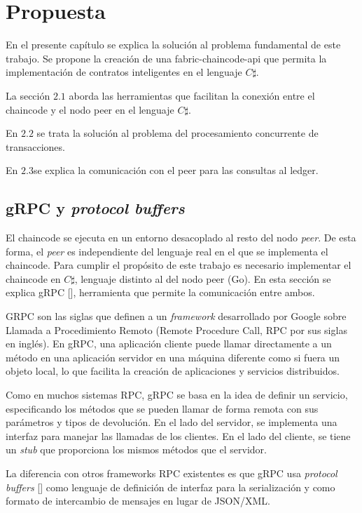 \chapter{Propuesta}\label{chapter:proposal}
En el presente capítulo se explica la solución al problema fundamental de este trabajo. Se propone la creación de una fabric-chaincode-api que permita la implementación de contratos inteligentes en el lenguaje $ C\sharp $.

La sección $ 2.1 $ aborda las herramientas que facilitan la conexión entre el chaincode y el nodo peer en el lenguaje $ C\sharp $.

En $ 2.2 $ se trata la solución al problema del procesamiento concurrente de transacciones.

En $ 2.3  $se explica la comunicación con el peer para las consultas al ledger.

\section{gRPC y \textit{protocol buffers}}

El chaincode se ejecuta en un entorno desacoplado al resto del nodo \textit{peer}. De esta forma, el \textit{peer} es independiente del lenguaje real en el que se implementa el chaincode. Para cumplir el propósito de este trabajo es necesario implementar el chaincode en $ C\sharp$, lenguaje distinto al del nodo peer (Go). En esta sección se explica gRPC [\cite{grpc-doc}], herramienta que permite la comunicación entre ambos. 

GRPC son las siglas que definen a un \textit{framework} desarrollado por Google sobre Llamada a Procedimiento Remoto (Remote Procedure Call, RPC por sus siglas en inglés). En gRPC, una aplicación cliente puede llamar directamente a un método en una aplicación servidor en una máquina diferente como si fuera un objeto local, lo que facilita la creación de aplicaciones y servicios distribuidos. 

Como en muchos sistemas RPC, gRPC se basa en la idea de definir un servicio, especificando los métodos que se pueden llamar de forma remota con sus parámetros y tipos de devolución. En el lado del servidor, se implementa una interfaz para manejar las llamadas de los clientes. En el lado del cliente, se tiene un \textit{stub} que proporciona los mismos métodos que el servidor.

La diferencia con otros frameworks RPC existentes es que gRPC usa \textit{protocol buffers} [\cite{protobuf-doc}] como lenguaje de definición de interfaz para la serialización y como formato de intercambio de mensajes en lugar de JSON/XML.


